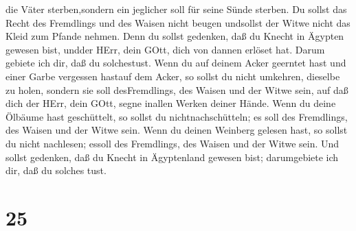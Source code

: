 die Väter sterben,sondern ein jeglicher soll für seine Sünde sterben.
 Du sollst das Recht des Fremdlings und des Waisen nicht
beugen undsollst der Witwe nicht das Kleid zum Pfande nehmen.
 Denn du sollst gedenken, daß du Knecht in Ägypten gewesen
bist, undder HErr, dein GOtt, dich von dannen erlöset hat. Darum gebiete
ich dir, daß du solchestust.  Wenn du auf deinem Acker
geerntet hast und einer Garbe vergessen hastauf dem Acker, so sollst du
nicht umkehren, dieselbe zu holen, sondern sie soll desFremdlings, des
Waisen und der Witwe sein, auf daß dich der HErr, dein GOtt, segne
inallen Werken deiner Hände.  Wenn du deine Ölbäume hast
geschüttelt, so sollst du nichtnachschütteln; es soll des Fremdlings,
des Waisen und der Witwe sein.  Wenn du deinen Weinberg
gelesen hast, so sollst du nicht nachlesen; essoll des Fremdlings, des
Waisen und der Witwe sein.  Und sollst gedenken, daß du
Knecht in Ägyptenland gewesen bist; darumgebiete ich dir, daß du solches
tust.

\hypertarget{section-24}{%
\section{25}\label{section-24}}

